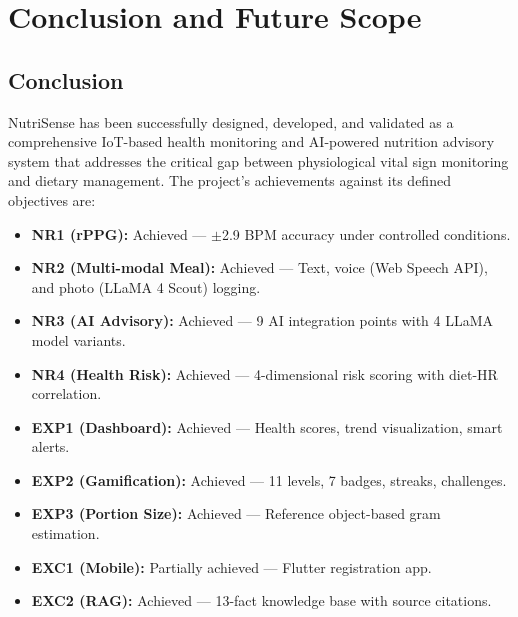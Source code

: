 \documentclass[12pt,a4paper]{report}
\begin{document}
\chapter{Conclusion and Future Scope}

\section{Conclusion}
NutriSense has been successfully designed, developed, and validated as a comprehensive IoT-based health monitoring and AI-powered nutrition advisory system that addresses the critical gap between physiological vital sign monitoring and dietary management. The project's achievements against its defined objectives are:

\begin{itemize}
  \item \textbf{NR1 (rPPG):} Achieved --- $\pm$2.9 BPM accuracy under controlled conditions.
  \item \textbf{NR2 (Multi-modal Meal):} Achieved --- Text, voice (Web Speech API), and photo (LLaMA 4 Scout) logging.
  \item \textbf{NR3 (AI Advisory):} Achieved --- 9 AI integration points with 4 LLaMA model variants.
  \item \textbf{NR4 (Health Risk):} Achieved --- 4-dimensional risk scoring with diet-HR correlation.
  \item \textbf{EXP1 (Dashboard):} Achieved --- Health scores, trend visualization, smart alerts.
  \item \textbf{EXP2 (Gamification):} Achieved --- 11 levels, 7 badges, streaks, challenges.
  \item \textbf{EXP3 (Portion Size):} Achieved --- Reference object-based gram estimation.
  \item \textbf{EXC1 (Mobile):} Partially achieved --- Flutter registration app.
  \item \textbf{EXC2 (RAG):} Achieved --- 13-fact knowledge base with source citations.
\end{itemize}
\end{document}

